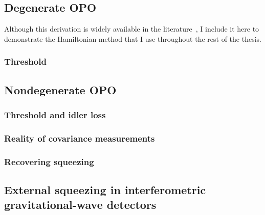 \subsection{Degenerate OPO}

Although this derivation is widely available in the literature~\cite{}, I include it here to demonstrate the Hamiltonian method that I use throughout the rest of the thesis. 



\subsubsection{Threshold}


\subsection{Nondegenerate OPO}

\subsubsection{Threshold and idler loss}

\subsubsection{Reality of covariance measurements}

\subsubsection{Recovering squeezing}



\subsection{External squeezing in interferometric gravitational-wave detectors}



